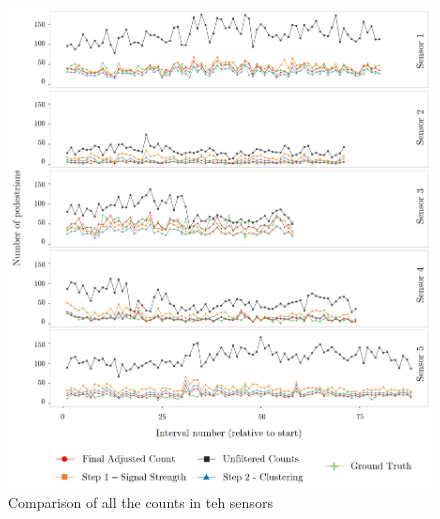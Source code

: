 \begin{figure}
	\begin{center}
		\includegraphics [width=\linewidth,trim=6 6 6 6,clip] {images/main_comparison.jpeg}
		\caption{Comparison of all the counts in teh sensors}
		\label{main_comparison}
	\end{center}
\end{figure}


